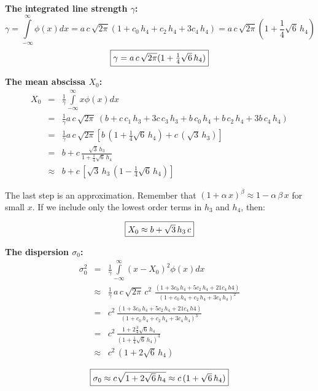 \documentclass[10pt,a4paper]{report}
\def\ampfac{\left(1+c_0\,h_4+c_2\,h_4+3c_4\,h_4\right)}
\begin{document}
\begin{flushleft}
\medskip
{\bf The integrated line strength $\gamma $:}
$$
\gamma = \int\limits_{-\infty}^{\infty} \phi(x) dx =
 a\,c\, \sqrt{2\pi} \ampfac
= a\,c\, \sqrt{2\pi} (1+\frac{1}{4}\sqrt{6}\,h_4)
$$
\begin{equation}
\framebox{$\gamma = a\,c\, \sqrt{2\pi} (1+\frac{1}{4}\sqrt{6}\,h_4)$}
\end{equation}

\vspace{1cm}
{\bf The mean abscissa $X_0$:}
\begin{eqnarray*}
X_0 &=& \frac{1}{\gamma}\int\limits_{-\infty}^{\infty} x \phi(x) dx\\
&=& \frac{1}{\gamma}  a\,c\, \sqrt{2\pi}\ 
(b+c\, c_1\,h_3+3c\,c_3\,h_3+b\,c_0\,h_4+b\,c_2\,h_4+3b\,c_4\,h_4)\\
&=& \frac{1}{\gamma}  a\,c\, \sqrt{2\pi}
\left[
b\, (1+\frac{1}{4}\sqrt{6}\,h_4)+c\, (\sqrt{3}\,h_3)
\right]\\
&=& b + c\,\frac{\sqrt{3}\,h_3}{1+\frac{1}{4}\sqrt{6}\,h_4}\\
&\approx & b + c\,\left[\sqrt{3}\,h_3\,(1-\frac{1}{4}\sqrt{6}\,h_4)\right]
\end{eqnarray*} 

The last step is an approximation. Remember that 
${(1+\alpha\,x)}^\beta \approx 1-\alpha\,\beta\,x$ for small $x$.
If we include only the lowest order terms in $h_3$ and $h_4$, then:

\begin{equation} 
\framebox{$X_0 \approx b + \sqrt{3}\,h_3\,c$}
\end{equation}

\vspace{1cm}
{\bf The dispersion $\sigma_0$:}
\begin{eqnarray*}
\sigma^2_0 &=& \frac{1}{\gamma}\int\limits_{-\infty}^{\infty} (x-X_0)^{2}
\phi(x) dx\\
&\approx & \frac{1}{\gamma}\,a\,c\, \sqrt{2\pi}\, c^2\,\, 
\frac{
\left( 
1+3c_0\,h_4+5c_2\,h_4+21c_4\,h4
\right)
}
{ \ampfac^2 } \\ 
&=& c^2\, \frac{\left(1+3c_0\,h_4+5c_2\,h_4+21c_4\,h4 \right) }
{\ampfac^3 }\\
&=& c^2\,
\frac{1+2\frac{3}{4}\sqrt{6}\,h_4}{{\left(1+\frac{1}{4}\sqrt{6}\,h_4\right)}^3}\\
&\approx & c^2\,(1+2\sqrt{6}\,h_4)
\end{eqnarray*} 

\begin{equation}
\framebox{$\sigma_0 \approx c\sqrt{1+2\sqrt{6}\,h_4} \approx c\,(1+\sqrt{6}\,h_4)$}
\end{equation}


\end{flushleft}
\end{document}
